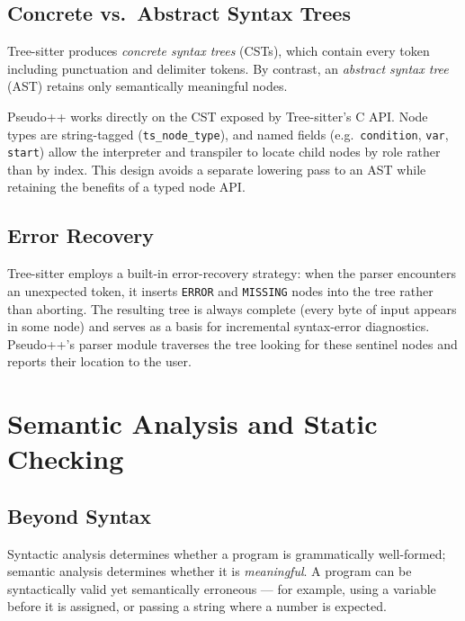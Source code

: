 \subsection{Concrete vs.\ Abstract Syntax Trees}

Tree-sitter produces \textit{concrete syntax trees} (CSTs), which contain every
token including punctuation and delimiter tokens.  By contrast, an
\textit{abstract syntax tree} (AST) retains only semantically meaningful nodes.

Pseudo++ works directly on the CST exposed by Tree-sitter's C API.  Node types
are string-tagged (\texttt{ts\_node\_type}), and named fields (e.g.\
\texttt{condition}, \texttt{var}, \texttt{start}) allow the interpreter and
transpiler to locate child nodes by role rather than by index.  This design avoids
a separate lowering pass to an AST while retaining the benefits of a typed node API.

\subsection{Error Recovery}

Tree-sitter employs a built-in error-recovery strategy: when the parser encounters
an unexpected token, it inserts \texttt{ERROR} and \texttt{MISSING} nodes into the
tree rather than aborting.  The resulting tree is always complete (every byte of
input appears in some node) and serves as a basis for incremental syntax-error
diagnostics.  Pseudo++'s parser module traverses the tree looking for these sentinel
nodes and reports their location to the user.

\section{Semantic Analysis and Static Checking}
\label{sec:semantic-analysis}

\subsection{Beyond Syntax}

Syntactic analysis determines whether a program is grammatically well-formed;
semantic analysis determines whether it is \textit{meaningful}.  A program can
be syntactically valid yet semantically erroneous --- for example, using a
variable before it is assigned, or passing a string where a number is expected.

